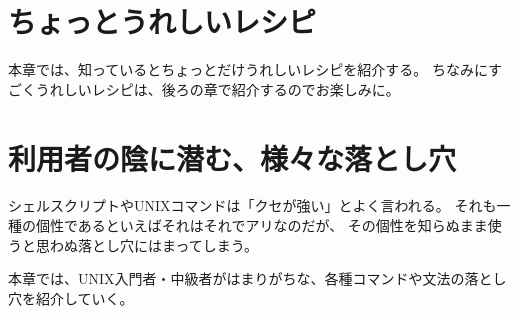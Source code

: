 \documentclass[b5paper,9pt,fleqn,tombow,openany]{jsbook}
\begin{document}

\frontmatter



\tableofcontents



\mainmatter

\chapter{ちょっとうれしいレシピ}

本章では、知っているとちょっとだけうれしいレシピを紹介する。
ちなみにすごくうれしいレシピは、後ろの章で紹介するのでお楽しみに。



\chapter{利用者の陰に潜む、様々な落とし穴}

シェルスクリプトやUNIXコマンドは「クセが強い」とよく言われる。
それも一種の個性であるといえばそれはそれでアリなのだが、
その個性を知らぬまま使うと思わぬ落とし穴にはまってしまう。

本章では、UNIX入門者・中級者がはまりがちな、各種コマンドや文法の落とし穴を紹介していく。

\end{document}
